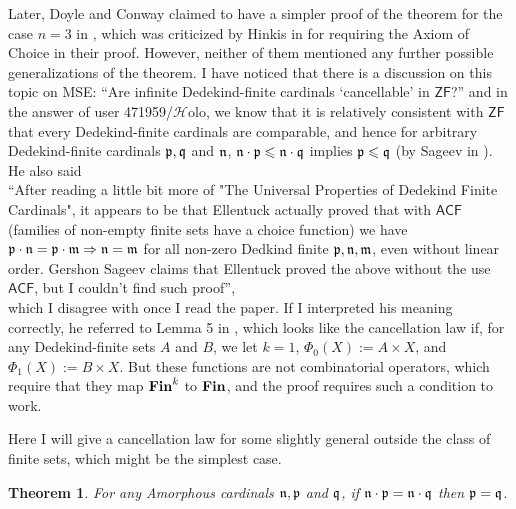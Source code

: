 \documentclass{amsart}
\newcommand{\ZF}{\ensuremath{\mathsf{ZF}}}
\newcommand{\ACF}{\ensuremath{\mathsf{ACF}}}
\newcommand{\Fin}{\textbf{\textup{Fin}}}
\renewcommand{\leq}{\leqslant}
\newcommand{\1}{\ensuremath{\mathds{1}}}
\theoremstyle{plain}
\newtheorem{thm}{Theorem}[section]
\theoremstyle{boldrk}
\theoremstyle{definition}
\begin{document}
Later, Doyle and Conway claimed to have a simpler proof of the theorem for the case \( n=3 \) in \cite[1994]{dv3}, which was criticized by Hinkis in \cite[2013]{HK} for requiring the Axiom of Choice in their proof. However, neither of them mentioned any further possible generalizations of the theorem. I have noticed that there is a discussion on this topic on MSE: ``Are infinite Dedekind-finite cardinals `cancellable' in \(\ZF\)?'' \cite[2022]{mse} and in the answer of user 471959/$\mathcal{H}$olo, we know that it is relatively consistent with $\ZF$ that every Dedekind-finite cardinals are comparable, and hence for arbitrary Dedekind-finite cardinals $\frak{p},\frak{q}$ and $\frak{n}$, $\frak{n}\cdot\frak{p}\leq\frak{n}\cdot\frak{q}$ implies $\frak{p}\leq\frak{q}$ (by Sageev in \cite{comp}). He also said\\[0.4em] ``After reading a little bit more of "The Universal Properties of Dedekind Finite Cardinals", it appears to be that Ellentuck actually proved that with $\ACF$ (families of non-empty finite sets have a choice function) we have $\frak{p}\cdot \frak{n}=\frak{p}\cdot\frak{m}\Rightarrow\frak{n}=\frak{m}$
 for all non-zero Dedkind finite $\frak{p},\frak{n},\frak{m}$, even without linear order. Gershon Sageev claims that Ellentuck proved the above without the use $\ACF$, but I couldn't find such proof'',\\[0.4em] which I disagree with once I read the paper. If I interpreted his meaning correctly, he referred to Lemma 5 in \cite{universal}, which looks like the cancellation law if, for any Dedekind-finite sets $A$ and $B$, we let $k=1$, $\Phi_{0}(X) := A \times X$, and $\Phi_{1}(X) := B \times X$. But these functions are not combinatorial operators, which require that they map $\Fin^{k}$ to $\Fin$, and the proof requires such a condition to work.

Here I will give a cancellation law for some slightly general outside the class of finite sets, which might be the simplest case.

\begin{thm}
    For any Amorphous cardinals $\frak{n},\frak{p}$ and $\frak{q}$, if $\frak{n}\cdot \frak{p}=\frak{n}\cdot\frak{q}$ then $\frak{p}=\frak{q}$.
\end{thm}
\end{document}
